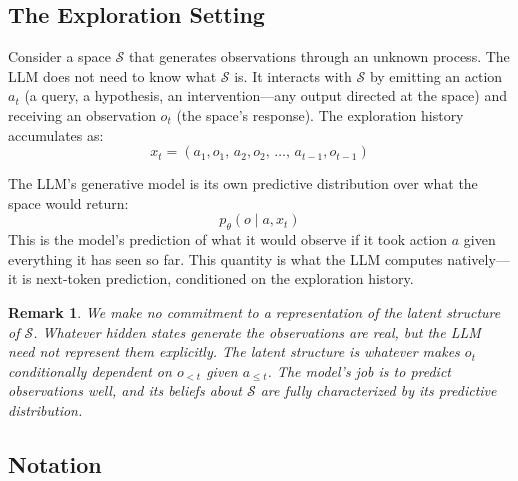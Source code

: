 \documentclass[11pt]{article}
\newtheorem{remark}{Remark}
\begin{document}
\subsection{The Exploration Setting}

Consider a space $\mathcal{S}$ that generates observations through an unknown process. The LLM does not need to know what $\mathcal{S}$ is. It interacts with $\mathcal{S}$ by emitting an action $a_t$ (a query, a hypothesis, an intervention---any output directed at the space) and receiving an observation $o_t$ (the space's response). The exploration history accumulates as:
\begin{equation}
\label{eq:history}
x_t = (a_1, o_1, \, a_2, o_2, \, \ldots, \, a_{t-1}, o_{t-1})
\end{equation}

The LLM's generative model is its own predictive distribution over what the space would return:
\begin{equation}
\label{eq:predictive}
p_\theta(o \mid a, x_t)
\end{equation}
This is the model's prediction of what it would observe if it took action $a$ given everything it has seen so far. This quantity is what the LLM computes natively---it is next-token prediction, conditioned on the exploration history.

\begin{remark}
We make no commitment to a representation of the latent structure of $\mathcal{S}$. Whatever hidden states generate the observations are real, but the LLM need not represent them explicitly. The latent structure is whatever makes $o_t$ conditionally dependent on $o_{<t}$ given $a_{\leq t}$. The model's job is to predict observations well, and its beliefs about $\mathcal{S}$ are fully characterized by its predictive distribution.
\end{remark}


\subsection{Notation}
\end{document}
